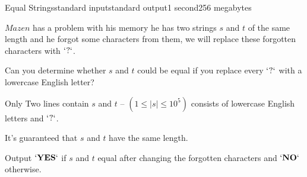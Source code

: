\begin{problem}{Equal Strings}{standard input}{standard output}{1 second}{256 megabytes}

$Mazen$ has a problem with his memory he has two strings $s$ and $t$ of the same length and he forgot some characters from them, we will replace these forgotten characters with $\bf{`?`}$.

Can you determine whether $s$ and $t$ could be equal if you replace every $\bf{`?`}$ with a lowercase English letter?

\InputFile
Only Two lines contain $s$ and $t$ -- $(1 \le |s| \le 10^5)$ consists of lowercase English letters and $\bf{`?`}$.

It's guaranteed that $s$ and $t$ have the same length.

\OutputFile
Output $\bf{`YES`}$ if $s$ and $t$ equal after changing the forgotten characters and $\bf{`NO`}$ otherwise.

\Example

\begin{example}
%
\end{example}

\end{problem}

